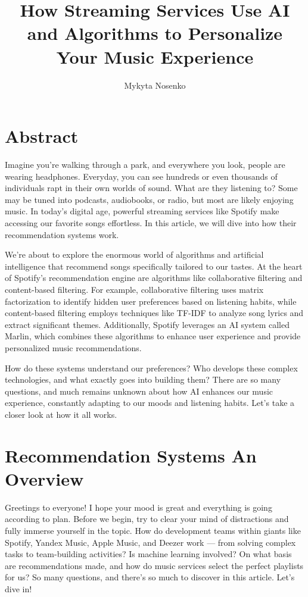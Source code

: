 \documentclass[12pt,a4paper]{article}
\title{How Streaming Services Use AI and Algorithms to Personalize Your Music Experience}
\author{Mykyta Nosenko}
\begin{document}
\maketitle
\section*{Abstract}

Imagine you’re walking through a park, and everywhere you look, people are wearing headphones. Everyday, you can see hundreds or even thousands of individuals rapt in their own worlds of sound. What are they listening to? Some may be tuned into podcasts, audiobooks, or radio, but most are likely enjoying music. In today’s digital age, powerful streaming services like Spotify make accessing our favorite songs effortless. In this article, we will dive into how their recommendation systems work.

We’re about to explore the enormous world of algorithms and artificial intelligence that recommend songs specifically tailored to our tastes. At the heart of Spotify’s recommendation engine are algorithms like collaborative filtering and content-based filtering. For example, collaborative filtering uses matrix factorization to identify hidden user preferences based on listening habits, while content-based filtering employs techniques like TF-IDF to analyze song lyrics and extract significant themes. Additionally, Spotify leverages an AI system called Marlin, which combines these algorithms to enhance user experience and provide personalized music recommendations\citep{href}.

How do these systems understand our preferences? Who develops these complex technologies, and what exactly goes into building them? There are so many questions, and much remains unknown about how AI enhances our music experience, constantly adapting to our moods and listening habits. Let's take a closer look at how it all works.

\newpage
\tableofcontents
\newpage

\section{Recommendation Systems An Overview}



Greetings to everyone! I hope your mood is great and everything is going according to plan. Before we begin, try to clear your mind of distractions and fully immerse yourself in the topic. How do development teams within giants like Spotify, Yandex Music, Apple Music, and Deezer work — from solving complex tasks to team-building activities? Is machine learning involved? On what basis are recommendations made, and how do music services select the perfect playlists for us? So many questions, and there's so much to discover in this article. Let's dive in!
\end{document}
